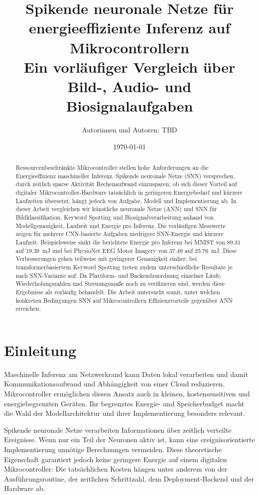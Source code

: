 \documentclass[11pt,a4paper]{article}
\title{Spikende neuronale Netze für energieeffiziente Inferenz auf Mikrocontrollern\\\large Ein vorläufiger Vergleich über Bild-, Audio- und Biosignalaufgaben}
\author{Autorinnen und Autoren: TBD}
\date{\today}
\begin{document}
\maketitle
\begin{abstract}
Ressourcenbeschränkte Mikrocontroller stellen hohe Anforderungen an die Energieeffizienz maschineller Inferenz. Spikende neuronale Netze (SNN) versprechen, durch zeitlich sparse Aktivität Rechenaufwand einzusparen; ob sich dieser Vorteil auf digitaler Mikrocontroller-Hardware tatsächlich in geringeren Energiebedarf und kürzere Laufzeiten übersetzt, hängt jedoch von Aufgabe, Modell und Implementierung ab. In dieser Arbeit vergleichen wir künstliche neuronale Netze (ANN) und SNN für Bildklassifikation, Keyword Spotting und Biosignalverarbeitung anhand von Modellgenauigkeit, Laufzeit und Energie pro Inferenz. Die vorläufigen Messwerte zeigen für mehrere CNN-basierte Aufgaben niedrigere SNN-Energie und kürzere Laufzeit. Beispielsweise sinkt die berichtete Energie pro Inferenz bei MNIST von 89.31 auf 19.39~mJ und bei PhysioNet EEG Motor Imagery von 37.49 auf 25.76~mJ. Diese Verbesserungen gehen teilweise mit geringerer Genauigkeit einher; bei transformerbasiertem Keyword Spotting treten zudem unterschiedliche Resultate je nach SNN-Variante auf. Da Plattform- und Backendzuordnung einzelner Läufe, Wiederholungszahlen und Streuungsmaße noch zu verifizieren sind, werden diese Ergebnisse als vorläufig behandelt. Die Arbeit untersucht somit, unter welchen konkreten Bedingungen SNN auf Mikrocontrollern Effizienzvorteile gegenüber ANN erreichen.
\end{abstract}

\section{Einleitung}
Maschinelle Inferenz am Netzwerkrand kann Daten lokal verarbeiten und damit Kommunikationsaufwand und Abhängigkeit von einer Cloud reduzieren. Mikrocontroller ermöglichen diesen Ansatz auch in kleinen, kostensensitiven und energiebegrenzten Geräten. Ihr begrenztes Energie- und Speicherbudget macht die Wahl der Modellarchitektur und ihrer Implementierung besonders relevant.

Spikende neuronale Netze verarbeiten Informationen über zeitlich verteilte Ereignisse. Wenn nur ein Teil der Neuronen aktiv ist, kann eine ereignisorientierte Implementierung unnötige Berechnungen vermeiden. Diese theoretische Eigenschaft garantiert jedoch keine geringere Energie auf einem digitalen Mikrocontroller: Die tatsächlichen Kosten hängen unter anderem von der Ausführungsroutine, der zeitlichen Schrittzahl, dem Deployment-Backend und der Hardware ab.
\end{document}
